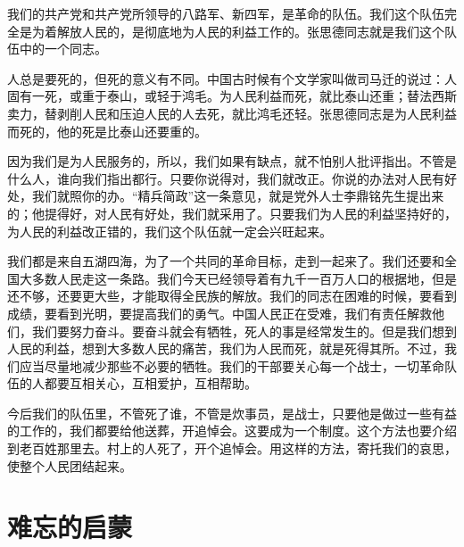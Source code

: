 \documentclass[12pt,UTF-8,openany]{ctexbook}
\begin{document}
\begin{large}
    
    我们的共产党和共产党所领导的八路军、新四军，是革命的队伍。我们这个队伍完全是为着解放人民的，是彻底地为人民的利益工作的。张思德同志就是我们这个队伍中的一个同志。
    
    人总是要死的，但死的意义有不同。中国古时候有个文学家叫做司马迁的说过：人固有一死，或重于泰山，或轻于鸿毛。为人民利益而死，就比泰山还重；替法西斯卖力，替剥削人民和压迫人民的人去死，就比鸿毛还轻。张思德同志是为人民利益而死的，他的死是比泰山还要重的。
    
    因为我们是为人民服务的，所以，我们如果有缺点，就不怕别人批评指出。不管是什么人，谁向我们指出都行。只要你说得对，我们就改正。你说的办法对人民有好处，我们就照你的办。“精兵简政”这一条意见，就是党外人士李鼎铭先生提出来的；他提得好，对人民有好处，我们就采用了。只要我们为人民的利益坚持好的，为人民的利益改正错的，我们这个队伍就一定会兴旺起来。
    
    我们都是来自五湖四海，为了一个共同的革命目标，走到一起来了。我们还要和全国大多数人民走这一条路。我们今天已经领导着有九千一百万人口的根据地，但是还不够，还要更大些，才能取得全民族的解放。我们的同志在困难的时候，要看到成绩，要看到光明，要提高我们的勇气。中国人民正在受难，我们有责任解救他们，我们要努力奋斗。要奋斗就会有牺牲，死人的事是经常发生的。但是我们想到人民的利益，想到大多数人民的痛苦，我们为人民而死，就是死得其所。不过，我们应当尽量地减少那些不必要的牺牲。我们的干部要关心每一个战士，一切革命队伍的人都要互相关心，互相爱护，互相帮助。
    
    今后我们的队伍里，不管死了谁，不管是炊事员，是战士，只要他是做过一些有益的工作的，我们都要给他送葬，开追悼会。这要成为一个制度。这个方法也要介绍到老百姓那里去。村上的人死了，开个追悼会。用这样的方法，寄托我们的哀思，使整个人民团结起来。
    
\end{large}



\chapter{难忘的启蒙}
\end{document}
